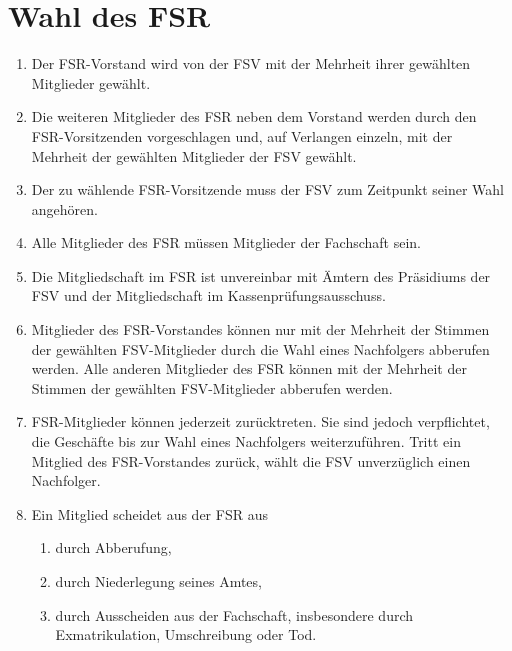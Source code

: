 \documentclass{article}
\begin{document}
\section{Wahl des FSR}    
\begin{enumerate}[(1)]
    \item Der FSR-Vorstand wird von der FSV mit der Mehrheit ihrer gewählten Mitglieder gewählt.
    \item Die weiteren Mitglieder des FSR neben dem Vorstand werden durch den FSR-Vorsitzenden vorgeschlagen und, auf Verlangen einzeln, mit der Mehrheit der gewählten Mitglieder der FSV gewählt.
    \item Der zu wählende FSR-Vorsitzende muss der FSV zum Zeitpunkt seiner Wahl angehören.
    \item Alle Mitglieder des FSR müssen Mitglieder der Fachschaft sein.
    \item Die Mitgliedschaft im FSR ist unvereinbar mit Ämtern des Präsidiums der FSV und der Mitgliedschaft im Kassenprüfungsausschuss.
    \item Mitglieder des FSR-Vorstandes können nur mit der Mehrheit der Stimmen der gewählten FSV-Mitglieder durch die Wahl eines Nachfolgers abberufen werden. Alle anderen Mitglieder des FSR können mit der Mehrheit der Stimmen der gewählten FSV-Mitglieder abberufen werden.
    \item FSR-Mitglieder können jederzeit zurücktreten. Sie sind jedoch verpflichtet, die Geschäfte bis zur Wahl eines Nachfolgers weiterzuführen. Tritt ein Mitglied des FSR-Vorstandes zurück, wählt die FSV unverzüglich einen Nachfolger.
    \item Ein Mitglied scheidet aus der FSR aus
    \begin{enumerate}[1.]
    	\item durch Abberufung,
	    \item durch Niederlegung seines Amtes,
        \item durch Ausscheiden aus der Fachschaft, insbesondere durch Exmatrikulation, Umschreibung oder Tod.
	\end{enumerate} 
\end{enumerate}
\end{document}
